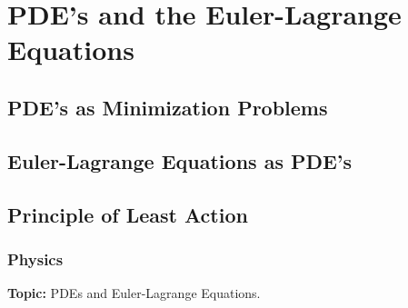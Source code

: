 \documentclass{article}
\theoremstyle{definition}
\begin{document}
\section{PDE's and the Euler-Lagrange Equations}

\subsection{PDE's as Minimization Problems}

\subsection{Euler-Lagrange Equations as PDE's}

\subsection{Principle of Least Action}

\subsubsection{Physics}
	
	
	
\noindent \textbf{Topic:} PDEs and Euler-Lagrange Equations.\\
\end{document}

